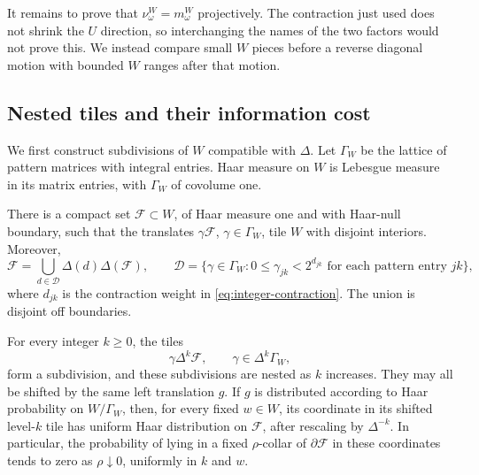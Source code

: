 It remains to prove that \(\nu^W_\omega=m^W_\omega\) projectively.
The contraction just used does not shrink the \(U\) direction, so
interchanging the names of the two factors would not prove this.
We instead compare small \(W\) pieces before a reverse diagonal
motion with bounded \(W\) ranges after that motion.

\subsection{Nested tiles and their information cost}

We first construct subdivisions of \(W\) compatible with \(\Delta\).
Let \(\Gamma_W\) be the lattice of pattern matrices with integral
entries.  Haar measure on \(W\) is Lebesgue measure in its matrix
entries, with \(\Gamma_W\) of covolume one.

\begin{lemma}\label{lem:tiles}
There is a compact set \(\mathcal F\subset W\), of Haar measure one
and with Haar-null boundary, such that the translates
\(\gamma\mathcal F\), \(\gamma\in\Gamma_W\), tile \(W\) with disjoint
interiors.  Moreover,
\[
 \mathcal F
    =\bigcup_{d\in\mathcal D}\Delta(d)\Delta(\mathcal F),
 \qquad
 \mathcal D=
 \{\gamma\in\Gamma_W:0\le \gamma_{jk}<2^{d_{jk}}
                         \text{ for each pattern entry }jk\},
\]
where \(d_{jk}\) is the contraction weight in
\eqref{eq:integer-contraction}.
The union is disjoint off boundaries.

For every integer \(k\ge0\), the tiles
\[
       \gamma\Delta^k\mathcal F,\qquad
       \gamma\in\Delta^k\Gamma_W,
\]
form a subdivision, and these subdivisions are nested as \(k\)
increases.  They may all be shifted by the same left translation
\(g\).  If \(g\) is distributed according to Haar probability on
\(W/\Gamma_W\), then, for every fixed \(w\in W\), its coordinate
in its shifted level-\(k\) tile has uniform Haar distribution on
\(\mathcal F\), after rescaling by \(\Delta^{-k}\).
In particular, the probability of lying in a fixed
\(\rho\)-collar of \(\partial\mathcal F\) in these coordinates
tends to zero as \(\rho\downarrow0\), uniformly in \(k\) and \(w\).
\end{lemma}

